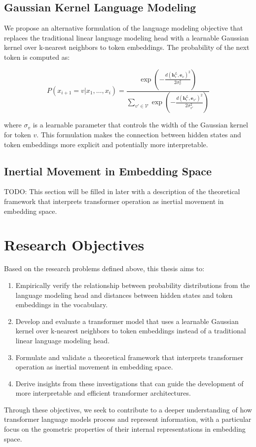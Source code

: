 \subsection{Gaussian Kernel Language Modeling}

We propose an alternative formulation of the language modeling objective that replaces the traditional linear language modeling head with a learnable Gaussian kernel over k-nearest neighbors to token embeddings. The probability of the next token is computed as:

\begin{equation}
    P(x_{i+1} = v | x_1, \ldots, x_i) = \frac{\exp\left(-\frac{d(\mathbf{h}_i^L, \mathbf{e}_v)^2}{2\sigma_v^2}\right)}{\sum_{v' \in \mathcal{V}} \exp\left(-\frac{d(\mathbf{h}_i^L, \mathbf{e}_{v'})^2}{2\sigma_{v'}^2}\right)}
    \label{eq::gaussian_kernel}
\end{equation}

where $\sigma_v$ is a learnable parameter that controls the width of the Gaussian kernel for token $v$. This formulation makes the connection between hidden states and token embeddings more explicit and potentially more interpretable.

\subsection{Inertial Movement in Embedding Space}

TODO: This section will be filled in later with a description of the theoretical framework that interprets transformer operation as inertial movement in embedding space.

\section{Research Objectives}

Based on the research problems defined above, this thesis aims to:

\begin{enumerate}
    \item Empirically verify the relationship between probability distributions from the language modeling head and distances between hidden states and token embeddings in the vocabulary.
    
    \item Develop and evaluate a transformer model that uses a learnable Gaussian kernel over k-nearest neighbors to token embeddings instead of a traditional linear language modeling head.
    
    \item Formulate and validate a theoretical framework that interprets transformer operation as inertial movement in embedding space.
    
    \item Derive insights from these investigations that can guide the development of more interpretable and efficient transformer architectures.
\end{enumerate}

Through these objectives, we seek to contribute to a deeper understanding of how transformer language models process and represent information, with a particular focus on the geometric properties of their internal representations in embedding space.
